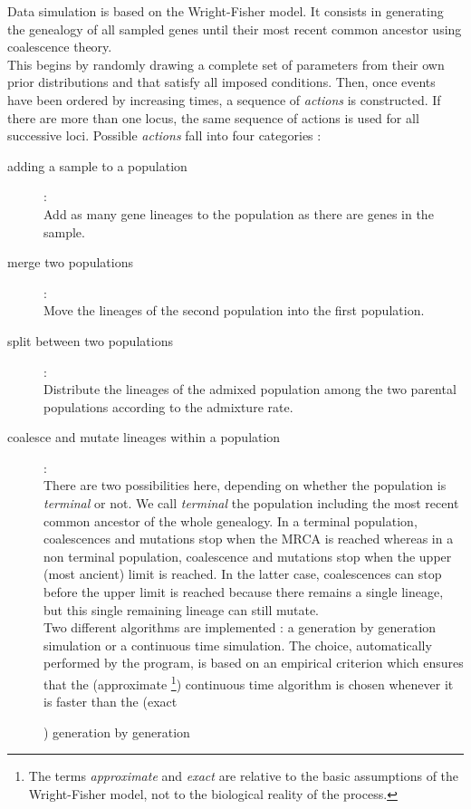 Data simulation is based on the Wright-Fisher model. It consists in
generating the genealogy of all sampled genes until their most recent
common ancestor using coalescence theory.\\
 This begins by randomly drawing a complete set of parameters from
their own prior distributions and that satisfy all imposed conditions.
Then, once events have been ordered by increasing times, a sequence
of \emph{actions} is constructed. If there are more than one locus,
the same sequence of actions is used for all successive loci. Possible
\emph{actions} fall into four categories :
\begin{description}
\item [{adding a sample to a population}] :\\
 Add as many gene lineages to the population as there are genes in
the sample.
\item [{merge two populations}] : \\
 Move the lineages of the second population into the first population.
\item [{split between two populations}] : \\
 Distribute the lineages of the admixed population among the two parental
populations according to the admixture rate.
\item [{coalesce and mutate lineages within a population}] : \\
 There are two possibilities here, depending on whether the population
is \emph{terminal} or not. We call \emph{terminal} the population
including the most recent common ancestor of the whole genealogy.
In a terminal population, coalescences and mutations stop when the
MRCA is reached whereas in a non terminal population, coalescence
and mutations stop when the upper (most ancient) limit is reached.
In the latter case, coalescences can stop before the upper limit is
reached because there remains a single lineage, but this single remaining
lineage can still mutate.\\
 Two different algorithms are implemented : a generation by generation
simulation or a continuous time simulation. The choice, automatically
performed by the program, is based on an empirical criterion which
ensures that the (approximate%
\footnote{The terms \emph{approximate} and \emph{exact} are relative to the
basic assumptions of the Wright-Fisher model, not to the biological
reality of the process.%
}) continuous time algorithm is chosen whenever it is faster than the
(exact\addtocounter{footnote}{-1}\footnotemark) generation by generation

\end{description}
